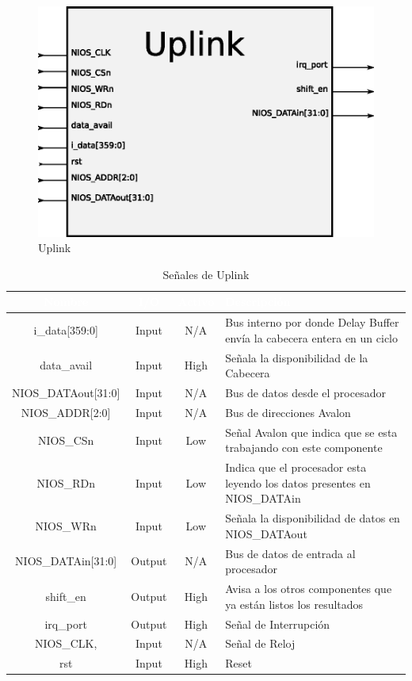 \begin{figure}[H]
  \centering
	\includegraphics[scale=0.55]{3-arquitectura/graf/bloquplink.eps}
  \caption{Uplink}
  \label{fig:bloquplink}
\end{figure}
	
\begin{table}
	\begin{tabular}{|c|c|c|p{6cm}|} \hline
\rowcolor[gray]{0.1} \textcolor{white}{Nombre} & \textcolor{white}{I/O} & \textcolor{white}{Activo} & \textcolor{white}{Descripción}\\ \hline
\rowcolor[gray]{0.75} i\_data[359:0] & Input & N/A & Bus interno por donde Delay Buffer envía la cabecera entera en un ciclo\\ \hline
\rowcolor[gray]{0.75} data\_avail & Input & High & Señala la disponibilidad de la Cabecera\\ \hline
\rowcolor[gray]{0.75} NIOS\_DATAout[31:0] & Input & N/A & Bus de datos desde el procesador\\ \hline
\rowcolor[gray]{0.75} NIOS\_ADDR[2:0] & Input & N/A & Bus de direcciones Avalon\\ \hline
\rowcolor[gray]{0.75} NIOS\_CSn & Input & Low & Señal Avalon que indica que se esta trabajando con este componente\\ \hline
\rowcolor[gray]{0.75} NIOS\_RDn & Input & Low & Indica que el procesador esta leyendo los datos presentes en NIOS\_DATAin \\ \hline
\rowcolor[gray]{0.75} NIOS\_WRn & Input & Low & Señala la disponibilidad de datos en NIOS\_DATAout\\ \hline
\rowcolor[gray]{0.9} NIOS\_DATAin[31:0] & Output & N/A & Bus de datos de entrada al procesador\\ \hline
\rowcolor[gray]{0.9} shift\_en & Output & High & Avisa a los otros componentes que ya están listos los resultados\\ \hline
\rowcolor[gray]{0.9} irq\_port & Output & High & Señal de Interrupción\\ \hline
 NIOS\_CLK, & Input & N/A & Señal de Reloj\\ \hline
 rst & Input & High & Reset\\ \hline
	\end{tabular}
	\caption{Señales de Uplink}
	\label{tab:sigup}
\end{table}

